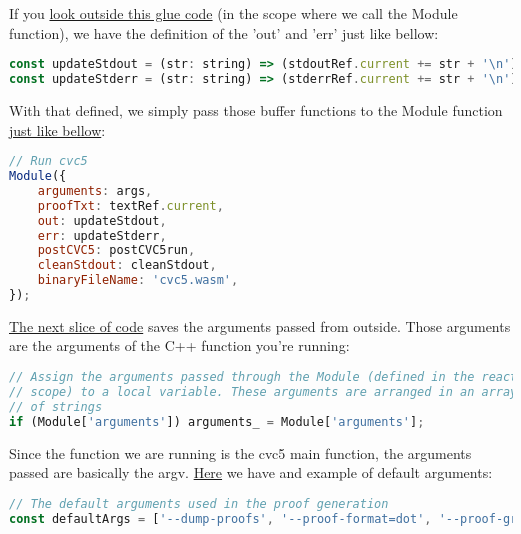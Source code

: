 \documentclass[12pt, a4paper]{article}
\begin{document}
If you \href{https://github.com/ufmg-smite/proof-visualizer/blob/main/frontend/src/components/VisualizerSmtDrawer/VisualizerSmtDrawer.tsx#L135-L136}{look outside this glue code} (in the scope where we call the Module function), we have the definition of the 'out' and 'err' just like bellow:

\begin{lstlisting}[language=JavaScript]
const updateStdout = (str: string) => (stdoutRef.current += str + '\n');
const updateStderr = (str: string) => (stderrRef.current += str + '\n');
\end{lstlisting}

With that defined, we simply pass those buffer functions to the Module function \href{https://github.com/ufmg-smite/proof-visualizer/blob/main/frontend/src/components/VisualizerSmtDrawer/VisualizerSmtDrawer.tsx#L357-L366}{just like bellow}:
\begin{lstlisting}[language=JavaScript]
// Run cvc5
Module({
    arguments: args,
    proofTxt: textRef.current,
    out: updateStdout,
    err: updateStderr,
    postCVC5: postCVC5run,
    cleanStdout: cleanStdout,
    binaryFileName: 'cvc5.wasm',
});
\end{lstlisting}

\href{https://github.com/ufmg-smite/proof-visualizer/blob/main/frontend/src/wasm/cvc5.js#L124-L127}{The next slice of code} saves the arguments passed from outside. Those arguments are the arguments of the C++ function you're running:

\begin{lstlisting}[language=JavaScript]
// Assign the arguments passed through the Module (defined in the react
// scope) to a local variable. These arguments are arranged in an array
// of strings
if (Module['arguments']) arguments_ = Module['arguments'];
\end{lstlisting}

Since the function we are running is the cvc5 main function, the arguments passed are basically the argv. \href{https://github.com/ufmg-smite/proof-visualizer/blob/main/frontend/src/components/VisualizerSmtDrawer/VisualizerSmtDrawer.tsx#L41-L42}{Here} we have and example of default arguments:

\begin{lstlisting}[language=JavaScript]
// The default arguments used in the proof generation
const defaultArgs = ['--dump-proofs', '--proof-format=dot', '--proof-granularity=theory-rewrite', '--dag-thresh=0'];
\end{lstlisting}
\end{document}
